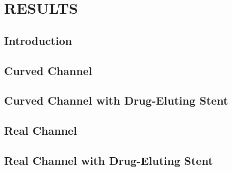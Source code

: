 \chapter{\textbf{RESULTS}}
\label{resultados}

\section{\textbf{Introduction}} 


\section{\textbf{Curved Channel}} 
\label{canal curvado}


\section{\textbf{Curved Channel with Drug-Eluting Stent}} 
\label{canal curvado com stent}


\section{\textbf{Real Channel}} 
\label{canal real}


\section{\textbf{Real Channel with Drug-Eluting Stent}} 
\label{canal real com stent}


